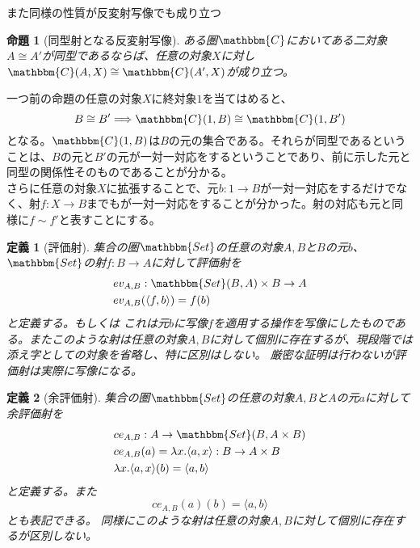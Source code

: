 \documentclass[uplatex,dvipdfmx]{jsarticle}
\newcommand{\cat}[1]{\mathbbm{#1}}
\newcommand{\arrow}{\rightarrow}
\newcommand{\tuple}[1]{\langle #1\rangle}
\newcommand{\mor}[3]{#1:#2\arrow #3}
\newcommand{\arset}[3]{\cat{#1}(#2,#3)}
\newtheorem{prop}{命題}[section]
\newtheorem{define}{定義}[section]
\numberwithin{proof}{subsection}
\numberwithin{prop}{subsection}
\numberwithin{define}{subsection}
\begin{document}
  また同様の性質が反変射写像でも成り立つ
  \begin{prop}[同型射となる反変射写像]
    ある圏$\cat{C}$においてある二対象$A\cong A'$が同型であるならば、任意の対象$X$に対し$\arset{C}{A}{X}\cong\arset{C}{A'}{X}$が成り立つ。
  \end{prop}

  一つ前の命題の任意の対象$X$に終対象$1$を当てはめると、\[B\cong B'\Longrightarrow \arset{C}{1}{B}\cong\arset{C}{1}{B'}\]となる。$\arset{C}{1}{B}$は$B$の元の集合である。それらが同型であるということは、$B$の元と$B'$の元が一対一対応をするということであり、前に示した元と同型の関係性そのものであることが分かる。\\
  さらに任意の対象$X$に拡張することで、元$\mor{b}{1}{B}$が一対一対応をするだけでなく、射$\mor{f}{X}{B}$までもが一対一対応をすることが分かった。射の対応も元と同様に$f\sim f'$と表すことにする。
  \begin{define}[評価射]
		集合の圏$\cat{Set}$の任意の対象$A,B$と$B$の元$b$、$\cat{Set}$の射$\mor{f}{B}{A}$に対して評価射を
		\begin{align*}
			\mor{&ev_{A,B}}{\arset{Set}{B}{A}\times B}{A}\\
			&ev_{A,B}(\tuple{f,b})=f(b)\\
		\end{align*}
		と定義する。もしくは
    これは元$b$に写像$f$を適用する操作を写像にしたものである。またこのような射は任意の対象$A,B$に対して個別に存在するが、現段階では添え字としての対象を省略し、特に区別はしない。
		厳密な証明は行わないが評価射は実際に写像になる。
	\end{define}

	\begin{define}[余評価射]
		集合の圏$\cat{Set}$の任意の対象$A,B$と$A$の元$a$に対して余評価射を
		\begin{align*}
			\mor{&ce_{A,B}}{A}{\arset{Set}{B}{A\times B}}\\
			&ce_{A,B}(a)=\lambda x.\tuple{a,x}\mor{}{B}{A\times B}\\
			&\lambda x.\tuple{a,x}(b)=\tuple{a,b}
		\end{align*}
		と定義する。また\[ce_{A,B}(a)(b)=\tuple{a,b}\]とも表記できる。
    同様にこのような射は任意の対象$A,B$に対して個別に存在するが区別しない。
	\end{define}
\end{document}

